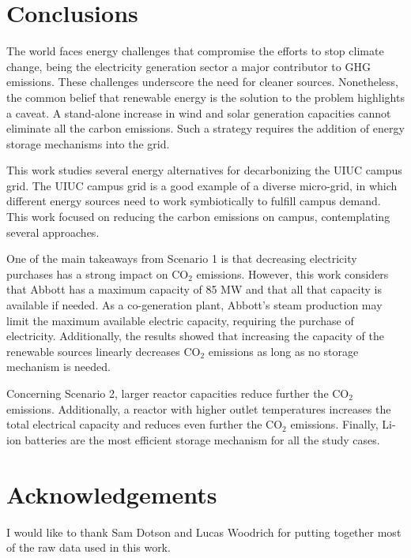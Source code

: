 \documentclass{anstrans}
\begin{document}
\section{Conclusions}

The world faces energy challenges that compromise the efforts to stop climate change, being the electricity generation sector a major contributor to GHG emissions.
These challenges underscore the need for cleaner sources.
Nonetheless, the common belief that renewable energy is the solution to the problem highlights a caveat.
A stand-alone increase in wind and solar generation capacities cannot eliminate all the carbon emissions.
Such a strategy requires the addition of energy storage mechanisms into the grid.

This work studies several energy alternatives for decarbonizing the UIUC campus grid.
The UIUC campus grid is a good example of a diverse micro-grid, in which different energy sources need to work symbiotically to fulfill campus demand.
This work focused on reducing the carbon emissions on campus, contemplating several approaches.

One of the main takeaways from Scenario 1 is that decreasing electricity purchases has a strong impact on CO$_2$ emissions.
However, this work considers that Abbott has a maximum capacity of 85 MW and that all that capacity is available if needed. As a co-generation plant, Abbott’s steam production may limit the maximum available electric capacity, requiring the purchase of electricity.
Additionally, the results showed that increasing the capacity of the renewable sources linearly decreases CO$_2$ emissions as long as no storage mechanism is needed.

Concerning Scenario 2, larger reactor capacities reduce further the CO$_2$ emissions.
Additionally, a reactor with higher outlet temperatures increases the total electrical capacity and reduces even further the CO$_2$ emissions.
Finally, Li-ion batteries are the most efficient storage mechanism for all the study cases.


\section{Acknowledgements}

I would like to thank Sam Dotson and Lucas Woodrich for putting together most of the raw data used in this work.




\end{document}
